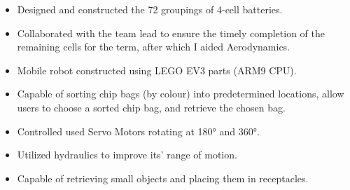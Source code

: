 \documentclass[10pt,a4paper]{altacv}
\begin{document}
\medskip

%





\begin{itemize}
\item Designed and constructed the 72 groupings of 4-cell batteries.
\item Collaborated with the team lead to ensure the timely completion of the remaining cells for the term, after which I aided Aerodynamics.
\end{itemize}

\divider
%

\medskip





\begin{itemize}
  \item Mobile robot constructed using LEGO EV3 parts (ARM9 CPU).
  \item Capable of sorting chip bags (by colour) into predetermined locations, allow users to choose a sorted chip bag, and retrieve the chosen bag.
\end{itemize}

\divider

%



\begin{itemize}
  \item Controlled used Servo Motors rotating at \ang{180} and \ang{360}.
  \item Utilized hydraulics to improve its' range of motion.
  \item Capable of retrieving small objects and placing them in receptacles.
\end{itemize}
\end{document}
